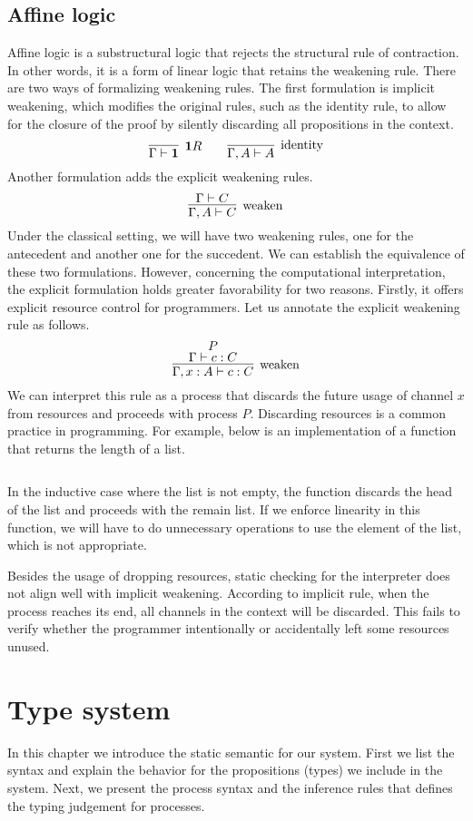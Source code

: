 \documentclass[12pt, openany]{memoir}
\begin{document}
\section{Affine logic}
Affine logic is a substructural logic that rejects the structural rule of contraction. 
In other words, it is a form of linear logic that retains the weakening rule. 
There are two ways of formalizing weakening rules. 
The first formulation is implicit weakening, which modifies the original rules, 
such as the identity rule, to allow for the closure of the proof by silently discarding all propositions in the context.
\[
  \infer[\textbf{1}R]{\Gamma \vdash \textbf{1}}{}
  \qquad
  \infer[\text{identity}]{\Gamma, A \vdash A}{}
\]
Another formulation adds the explicit weakening rules.
\[
  \infer[\text{weaken}]{\Gamma, A \vdash C}{\Gamma \vdash C}
\]
Under the classical setting, we will have two weakening rules, one for the antecedent and another one for the succedent.
We can establish the equivalence of these two formulations. 
However, concerning the computational interpretation, the explicit formulation holds greater favorability for two reasons.
Firstly, it offers explicit resource control for programmers. 
Let us annotate the explicit weakening rule as follows.
\[
  \infer[\text{weaken}]{\Gamma, x : A \vdash c : C}{
    \deduce{\Gamma \vdash c : C}{P}
  }
\]
We can interpret this rule as a process that discards the future usage of channel $x$ from resources and proceeds with process $P$. 
Discarding resources is a common practice in programming. For example, below is an implementation of a function that returns the length of a list.
\inputminted{ocaml}{code/length.ml}
In the inductive case where the list is not empty, the function discards the head of the list and proceeds with the remain list.
If we enforce linearity in this function, we will have to do unnecessary operations to use the element of the list, which is not appropriate.

Besides the usage of dropping resources, static checking for the interpreter does not align well with implicit weakening. 
According to implicit rule, when the process reaches its end, all channels in the context will be discarded. 
This fails to verify whether the programmer intentionally or accidentally left some resources unused.

\chapter{Type system}
In this chapter we introduce the static semantic for our system. First we list the syntax and explain the behavior
for the propositions (types) we include in the system. Next, we present the process syntax and the inference rules that
defines the typing judgement for processes.
\end{document}
